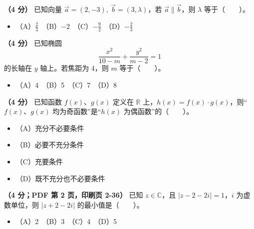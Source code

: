 \begin{question}
\textbf{（4 分）} 已知向量 \(\vec a=(2,-3),\ \vec b=(3,\lambda)\)，若 \(\vec a\parallel\vec b\)，则 \(\lambda\) 等于\mbox{（　　）}。

\begin{itemize}
\item （A）\(\frac23\)　（B）\(-2\)　（C）\(-\frac92\)　（D）\(-\frac23\)
\end{itemize}

\end{question}
\begin{question}
\textbf{（4 分）} 已知椭圆
\nopagebreak[4]
\[
\frac{x^2}{10-m}+\frac{y^2}{m-2}=1
\]
的长轴在 \(y\) 轴上。若焦距为 4，则 \(m\) 等于\mbox{（　　）}。

\begin{itemize}
\item （A）4　（B）5　（C）7　（D）8
\end{itemize}

\end{question}
\begin{question}
\textbf{（4 分）} 已知函数 \(f(x)\text{、}g(x)\) 定义在 \(\mathbb R\) 上，\(h(x)=f(x)\cdot g(x)\)，则“\(f(x)\text{、}g(x)\) 均为奇函数”是“\(h(x)\) 为偶函数”的\mbox{（　　）}。

\begin{itemize}
\item （A）充分不必要条件
\item （B）必要不充分条件
\item （C）充要条件
\item （D）既不充分也不必要条件
\end{itemize}

\end{question}
\begin{question}
\textbf{（4 分；PDF 第 2 页，印刷页 2-36）} 已知 \(z\in\mathbb C\)，且 \(|z-2-2i|=1\)，\(i\) 为虚数单位，则 \(|z+2-2i|\) 的最小值是\mbox{（　　）}。

\begin{itemize}
\item （A）2　（B）3　（C）4　（D）5
\end{itemize}

\end{question}

